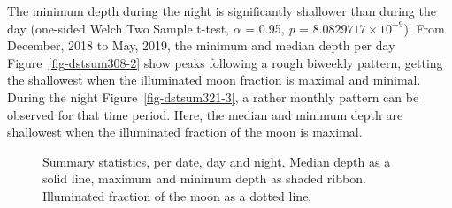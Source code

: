 \documentclass[
  authoryear,
  review,
  3p]{elsarticle}
\begin{document}
The minimum depth during the night is significantly shallower than
during the day (one-sided Welch Two Sample t-test, \(\alpha\) = 0.95,
\emph{p} = \ensuremath{8.0829717\times 10^{-9}}). From December, 2018 to
May, 2019, the minimum and median depth per day
Figure~\ref{fig-dstsum308-2} show peaks following a rough biweekly
pattern, getting the shallowest when the illuminated moon fraction is
maximal and minimal. During the night Figure~\ref{fig-dstsum321-3}, a
rather monthly pattern can be observed for that time period. Here, the
median and minimum depth are shallowest when the illuminated fraction of
the moon is maximal.

\begin{figure}

\begin{minipage}[t]{\linewidth}

{\centering 


}

\end{minipage}%
\newline
\begin{minipage}[t]{0.50\linewidth}

{\centering 


}

\end{minipage}%
%
\begin{minipage}[t]{0.50\linewidth}

{\centering 


}

\end{minipage}%

\caption{\label{fig-dstsum321}Summary statistics, per date, day and
night. Median depth as a solid line, maximum and minimum depth as shaded
ribbon. Illuminated fraction of the moon as a dotted line.}

\end{figure}
\end{document}
